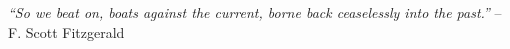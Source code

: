 \thispagestyle{empty}

\null\vfill

\begin{center}
\emph{``So we beat on, boats against the current, borne back ceaselessly into the past.''} -- F. Scott Fitzgerald
\end{center}

\vspace{10cm}

\clearpage
